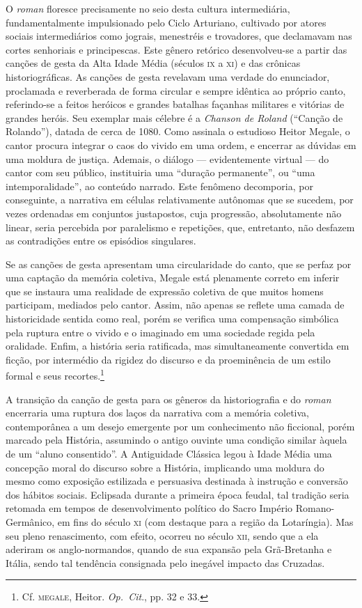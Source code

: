 O \textit{roman} floresce precisamente no seio desta cultura
intermediária, fundamentalmente impulsionado pelo Ciclo Arturiano,
cultivado por atores sociais intermediários como jograis, menestréis e
trovadores, que declamavam nas cortes senhoriais e principescas. Este
gênero retórico desenvolveu-se a partir das canções de gesta da Alta
Idade Média (séculos \textsc{ix} a \textsc{xi}) e das crônicas historiográficas. As
canções de gesta revelavam uma verdade do enunciador, proclamada e
reverberada de forma circular e sempre idêntica ao próprio canto,
referindo-se a feitos heróicos e grandes batalhas façanhas militares e
vitórias de grandes heróis. Seu exemplar mais célebre é a
\textit{Chanson de Roland} (“Canção de Rolando”), datada de cerca de 
1080. Como assinala o estudioso Heitor Megale, o cantor procura
integrar o caos do vivido em uma ordem, e encerrar as dúvidas em uma
moldura de justiça. Ademais, o diálogo --- evidentemente virtual --- do
cantor com seu público, instituiria uma “duração permanente”, ou “uma
intemporalidade”, ao conteúdo narrado. Este fenômeno decomporia, por
conseguinte, a narrativa em células relativamente autônomas que se
sucedem, por vezes ordenadas em conjuntos justapostos, cuja progressão,
absolutamente não linear, seria percebida por paralelismo e repetições,
que, entretanto, não desfazem as contradições entre os episódios
singulares.

Se as canções de gesta apresentam uma circularidade do canto, que se
perfaz por uma captação da memória coletiva, Megale está plenamente
correto em inferir que se instaura uma realidade de expressão coletiva
de que muitos homens participam, mediados pelo cantor. Assim, não
apenas se reflete uma camada de historicidade sentida como real, porém
se verifica uma compensação simbólica pela ruptura entre o vivido e o
imaginado em uma sociedade regida pela oralidade. Enfim, a história
seria ratificada, mas  simultaneamente convertida em ficção, por
intermédio da rigidez do discurso e da proeminência de um estilo formal
e seus recortes.\footnote{ Cf. \textsc{megale}, Heitor. \textit{Op.~Cit}., pp.
32 e 33.}

 A transição da canção de gesta para os gêneros da historiografia e do
\textit{roman} encerraria uma ruptura dos laços da narrativa com a
memória coletiva, contemporânea a um desejo emergente por um
conhecimento não ficcional, porém marcado pela História, assumindo o
antigo ouvinte uma condição similar àquela de um “aluno consentido”. A 
Antiguidade Clássica legou à Idade Média uma concepção moral do
discurso sobre a História, implicando uma moldura do mesmo como
exposição estilizada e persuasiva destinada à instrução e conversão dos
hábitos sociais. Eclipsada durante a primeira época feudal, tal
tradição seria retomada em tempos de desenvolvimento político do Sacro
Império Romano-Germânico, em fins do século \textsc{xi} (com destaque para a
região da Lotaríngia). Mas seu pleno renascimento, com efeito, ocorreu
no século \textsc{xii}, sendo que a ela aderiram os anglo-normandos, quando de
sua expansão pela Grã-Bretanha e Itália, sendo tal tendência consignada
pelo inegável impacto das Cruzadas. 

